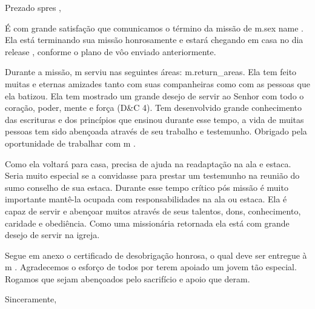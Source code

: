 \documentclass[12pt]{letter}
\begin{document}
\begin{letter}{Prezado {{ spres }},}

\date{ {{ date }} }
\opening{}

É com grande satisfação que comunicamos o término da missão de {{ m.sex }} {{ name }}. Ela está terminando sua missão honrosamente e estará chegando em casa no dia  {{ release }}, conforme o plano de vôo enviado anteriormente.

Durante a missão, {{ m }} serviu nas seguintes áreas: {{ m.return_areas}}. Ela tem feito muitas e eternas amizades tanto com suas companheiras como com as pessoas que ela batizou. Ela tem mostrado um grande desejo de servir ao Senhor com todo o coração, poder, mente e força (D\&C 4). Tem desenvolvido grande conhecimento das escrituras e dos princípios que ensinou durante esse tempo, a vida de muitas pessoas tem sido abençoada através de seu trabalho e testemunho. Obrigado pela oportunidade de trabalhar com {{ m }}.

Como ela voltará para casa, precisa de ajuda na readaptação na ala e estaca. Seria muito especial se a convidasse para prestar um testemunho na reunião do sumo conselho de sua estaca. Durante esse tempo crítico pós missão é muito importante mantê-la ocupada com responsabilidades na ala ou estaca. Ela é capaz de servir e abençoar muitos através de seus talentos, dons, conhecimento, caridade e obediência. Como uma missionária retornada ela está com grande desejo de servir na igreja.

Segue em anexo o certificado de desobrigação honrosa, o qual deve ser entregue à {{ m }}. Agradecemos o esforço de todos por terem apoiado um jovem tão especial. Rogamos que sejam abençoados pelo sacrifício e apoio que deram.

\closing{Sinceramente,}
\end{letter}
\end{document}
